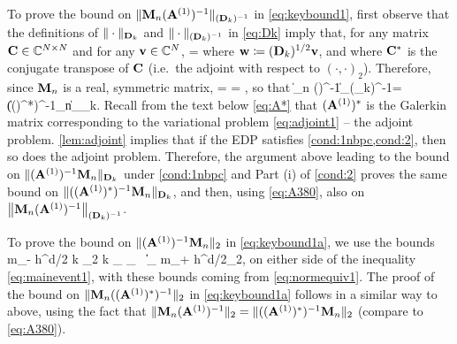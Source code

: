 To prove the bound on $\|\mathbf{M}_n(\mathbf{A}^{(1)})^{-1}\|_{(\mathbf{D}_k)^{-1}}$ in \cref{eq:keybound1}, first observe that the definitions of $\|\cdot\|_{\mathbf{D}_k}$ and $\|\cdot\|_{(\mathbf{D}_k)^{-1}}$ in \cref{eq:Dk} imply that, for any matrix $\mathbf{C} \in \mathbb C^{N\times N}$ and for any $\mathbf{v}\in \mathbb C^N$,
\beq\label{eq:A380-0}
 = 
\eeq
where $\mathbf{w} \coloneqq (\mathbf{D}_k)^{1/2}\mathbf{v}$, and where $\mathbf{C}^*$ is the conjugate transpose of $\mathbf{C}$ (i.e.~the adjoint with respect to $(\cdot,\cdot)_2$).
Therefore, since $\mathbf{M}_n$ is a real, symmetric matrix,
\beqs
{}
=
\frac{\NDk{\mleft(\AmatoI\Mmatn\mright)^* \bw}}{\NDk{\bw}}
= 
,
 \eeqs
 so that 
\beq\label{eq:A380} 
 \big\|\Mmat_n (\Amato)^{-1}\big\|_{(\Dmat_k)^{-1}}=\big\|((\Amato)^*)^{-1}\Mmat_n\big\|_{\Dmat_k}.
 \eeq 
Recall from the text below \cref{eq:A*} that $(\mathbf{A}^{(1)})^*$ is the Galerkin matrix corresponding to the variational problem \cref{eq:adjoint1} -- the adjoint problem. \cref{lem:adjoint} implies that if the EDP %
satisfies \cref{cond:1nbpc,cond:2}, then so does the adjoint problem. Therefore, the argument above leading to the bound on $\|(\mathbf{A}^{(1)})^{-1}\mathbf{M}_n\|_{\mathbf{D}_k}$ under \cref{cond:1nbpc} and Part (i) of \cref{cond:2} proves the same bound on $\|((\mathbf{A}^{(1)})^*)^{-1}\mathbf{M}_n\|_{\mathbf{D}_k}$, and then, using \cref{eq:A380}, also on $\big\|\mathbf{M}_n(\mathbf{A}^{(1)})^{-1}\big\|_{(\mathbf{D}_k)^{-1}}$.

To prove the bound on  $\|(\mathbf{A}^{(1)})^{-1}\mathbf{M}_n\|_{2}$ in \cref{eq:keybound1a}, we use the bounds 
\beqs
m_- h^{d/2} k \N{\tbu}_2 \leq k _{\LtDR} \leq {}_{\HokDR}
\,\tand\,
\big\|\big\|_{\LtDR} \leq m_+ h^{d/2}\N{\bff}_2,
\eeqs
on either side of the inequality \cref{eq:mainevent1}, with these bounds coming from \cref{eq:normequiv1}. The proof of the bound on 
$\|\mathbf{M}_n((\mathbf{A}^{(1)})^*)^{-1}\|_{2}$ in \cref{eq:keybound1a} follows in a similar way to above, using the fact that 
$\|\mathbf{M}_n (\mathbf{A}^{(1)})^{-1}\|_2=\|((\mathbf{A}^{(1)})^*)^{-1}\mathbf{M}_n\|_2$ (compare to \cref{eq:A380}).
%
%
\epf


